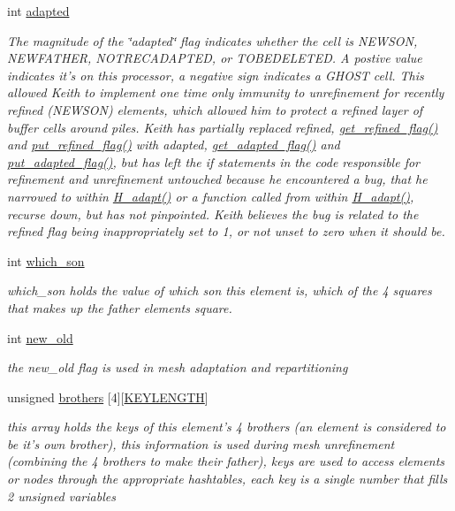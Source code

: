 \begin{CompactItemize}
int \hyperlink{classElement_r20}{adapted}
\begin{CompactList}\small\item\em The magnitude of the \char`\"{}adapted\char`\"{} flag indicates whether the cell is NEWSON, NEWFATHER, NOTRECADAPTED, or TOBEDELETED. A postive value indicates it's on this processor, a negative sign indicates a GHOST cell. This allowed Keith to implement one time only immunity to unrefinement for recently refined (NEWSON) elements, which allowed him to protect a refined layer of buffer cells around piles. Keith has partially replaced refined, \hyperlink{classElement_a33}{get\_\-refined\_\-flag()} and \hyperlink{classElement_a36}{put\_\-refined\_\-flag()} with adapted, \hyperlink{classElement_a34}{get\_\-adapted\_\-flag()} and \hyperlink{classElement_a37}{put\_\-adapted\_\-flag()}, but has left the if statements in the code responsible for refinement and unrefinement untouched because he encountered a bug, that he narrowed to within \hyperlink{hadpt_8C_a12}{H\_\-adapt()} or a function called from within \hyperlink{hadpt_8C_a12}{H\_\-adapt()}, recurse down, but has not pinpointed. Keith believes the bug is related to the refined flag being inappropriately set to 1, or not unset to zero when it should be. \item\end{CompactList}\item 
int \hyperlink{classElement_r21}{which\_\-son}
\begin{CompactList}\small\item\em which\_\-son holds the value of which son this element is, which of the 4 squares that makes up the father elements square. \item\end{CompactList}\item 
int \hyperlink{classElement_r22}{new\_\-old}
\begin{CompactList}\small\item\em the new\_\-old flag is used in mesh adaptation and repartitioning \item\end{CompactList}\item 
unsigned \hyperlink{classElement_r23}{brothers} \mbox{[}4\mbox{]}\mbox{[}\hyperlink{constant_8h_a10}{KEYLENGTH}\mbox{]}
\begin{CompactList}\small\item\em this array holds the keys of this element's 4 brothers (an element is considered to be it's own brother), this information is used during mesh unrefinement (combining the 4 brothers to make their father), keys are used to access elements or nodes through the appropriate hashtables, each key is a single number that fills 2 unsigned variables \item\end{CompactList}\item 

\end{CompactItemize}
